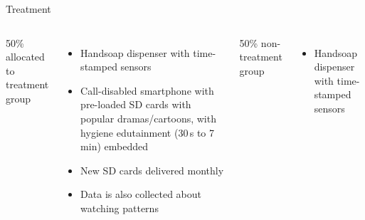 \documentclass[aspectratio=169]{beamer}
\begin{document}
\begin{frame}{Treatment}
	\begin{columns}
	50\% allocated to treatment group
	\begin{itemize}
		\item Handsoap dispenser with time-stamped sensors
		\item Call-disabled smartphone with pre-loaded SD cards with
			popular dramas/cartoons, with hygiene edutainment
			(30\,s to 7\,min) embedded
		\item New SD cards delivered monthly
		\item Data is also collected about watching patterns
	\end{itemize}


	50\% non-treatment group
	\begin{itemize}
		\item Handsoap dispenser with time-stamped sensors
	\end{itemize}

	\bigskip\bigskip
	

\end{columns}
\end{frame}
\end{document}
